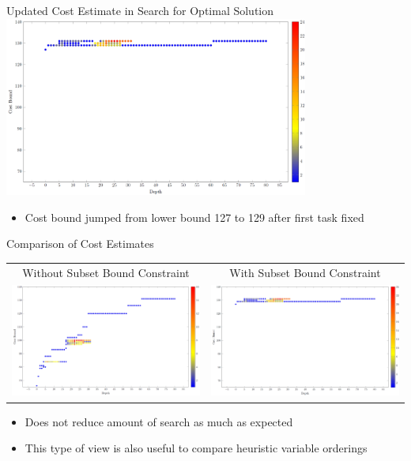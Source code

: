 \documentclass[dvipsnames,aspectratio=169]{beamer}
\begin{document}
\begin{frame}{Updated Cost Estimate in Search for Optimal Solution}
\includegraphics[width=10cm]{images/flowdepthcountrun29pushed.PNG}
\begin{itemize}
    \item Cost bound jumped from lower bound 127 to 129 after first task fixed
\end{itemize}
\end{frame}

\begin{frame}{Comparison of Cost Estimates}
\begin{tabular}{cc}
\scriptsize Without Subset Bound Constraint & \scriptsize With Subset Bound Constraint\\
\includegraphics[width=6.5cm]{images/flowdepthcountrun29.PNG}
&
\includegraphics[width=6.5cm]{images/flowdepthcountrun29pushed.PNG}
\end{tabular}
\begin{itemize}
    \item Does not reduce amount of search as much as expected
    \item This type of view is also useful to compare heuristic variable orderings
\end{itemize}
\end{frame}
\end{document}
